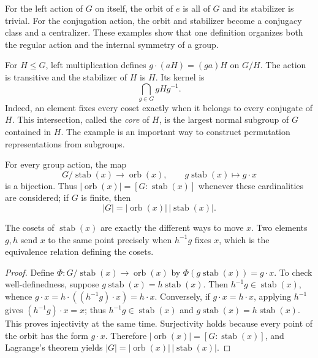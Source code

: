 \begin{example}
For the left action of \(G\) on itself, the orbit of \(e\) is all of \(G\)
and its stabilizer is trivial.  For the conjugation action, the orbit and
stabilizer become a conjugacy class and a centralizer.  These examples show
that one definition organizes both the regular action and the internal
symmetry of a group.
\end{example}

\begin{example}
For \(H\leq G\), left multiplication defines \(g\cdot(aH)=(ga)H\) on
\(G/H\).  The action is transitive and the stabilizer of \(H\) is \(H\).
Its kernel is
\[\bigcap_{g\in G}gHg^{-1}.\]
Indeed, an element fixes every coset exactly when it belongs to every conjugate
of \(H\).  This intersection, called the \emph{core} of \(H\), is the largest
normal subgroup of \(G\) contained in \(H\).  The example is an important way
to construct permutation representations from subgroups.
\end{example}

\begin{theorem}
For every group action, the map
\[
G/\operatorname{stab}(x)\longrightarrow\operatorname{orb}(x),\qquad
g\operatorname{stab}(x)\longmapsto g\cdot x
\]
is a bijection. Thus
\(|\operatorname{orb}(x)|=[G:\operatorname{stab}(x)]\) whenever these
cardinalities are considered; if \(G\) is finite, then
\[
|G|=|\operatorname{orb}(x)|\,|\operatorname{stab}(x)|.
\]
\end{theorem}
\begin{proofidea}
The cosets of \(\operatorname{stab}(x)\) are exactly the different ways to
move \(x\). Two
elements \(g,h\) send \(x\) to the same point precisely when
\(h^{-1}g\) fixes \(x\), which is the equivalence relation defining the cosets.
\end{proofidea}
\begin{proof}
Define \(\Phi:G/\operatorname{stab}(x)\to\operatorname{orb}(x)\) by
\(\Phi(g\operatorname{stab}(x))=g\cdot x\). To check well-definedness,
suppose \(g\operatorname{stab}(x)=h\operatorname{stab}(x)\). Then
\(h^{-1}g\in\operatorname{stab}(x)\), whence
\(g\cdot x=h\cdot((h^{-1}g)\cdot x)=h\cdot x\).  Conversely, if
\(g\cdot x=h\cdot x\), applying \(h^{-1}\) gives
\((h^{-1}g)\cdot x=x\); thus \(h^{-1}g\in\operatorname{stab}(x)\) and
\(g\operatorname{stab}(x)=h\operatorname{stab}(x)\). This
proves injectivity at the same time.  Surjectivity holds because every point
of the orbit has the form \(g\cdot x\). Therefore
\(|\operatorname{orb}(x)|=[G:\operatorname{stab}(x)]\), and Lagrange's
theorem yields \(|G|=|\operatorname{orb}(x)|\,|\operatorname{stab}(x)|\).
\end{proof}

